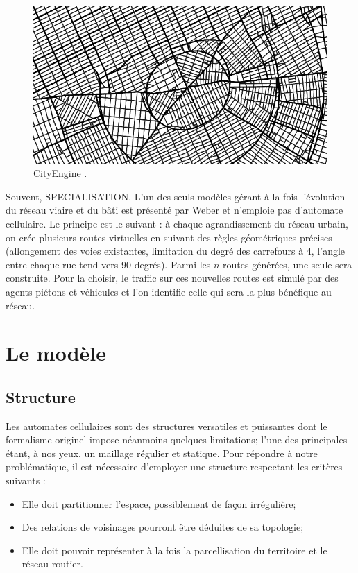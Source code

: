\documentclass[12pt]{article}
\begin{document}
\begin{figure}
  \centering
  \includegraphics[width=.8\linewidth]{images/cityengine.png}
  \caption{CityEngine \cite{Parish2001}.}
  \label{fig:cityengine}
\end{figure}

Souvent, SPECIALISATION. L'un des seuls modèles gérant à la fois
l'évolution du réseau viaire et du bâti est présenté par Weber
\cite{Weber2009} et n'emploie pas d'automate cellulaire. Le principe
est le suivant : à chaque agrandissement du réseau urbain, on crée
plusieurs routes virtuelles en suivant des règles géométriques
précises (allongement des voies existantes, limitation du degré des
carrefours à 4, l'angle entre chaque rue tend vers 90 degrés). Parmi
les $n$ routes générées, une seule sera construite. Pour la choisir,
le traffic sur ces nouvelles routes est simulé par des agents piétons
et véhicules et l'on identifie celle qui sera la plus bénéfique au
réseau.

\section{Le modèle}

\subsection{Structure}

Les automates cellulaires sont des structures versatiles et puissantes
dont le formalisme originel impose néanmoins quelques limitations;
l'une des principales étant, à nos yeux, un maillage régulier et
statique. Pour répondre à notre problématique, il est nécessaire
d'employer une structure respectant les critères suivants :

\begin{itemize}
\item{Elle doit partitionner l'espace, possiblement de façon
  irrégulière;}
\item{Des relations de voisinages pourront être déduites de sa
  topologie;}
\item{Elle doit pouvoir représenter à la fois la parcellisation du
  territoire et le réseau routier.}
\end{itemize}
\end{document}
